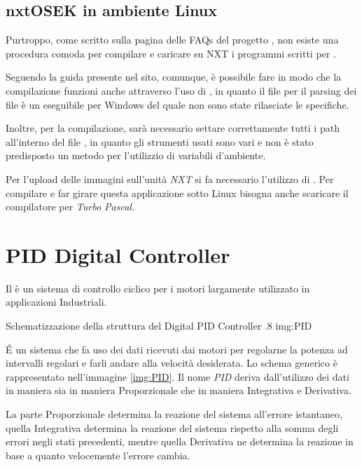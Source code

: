 \subsection{nxtOSEK in ambiente Linux} \label{sec:nxtoseklinux}
Purtroppo, come scritto sulla pagina delle FAQs del progetto
\nxtOSEK{}\cite{bib:nxtOSEKFAQs}, non esiste una procedura comoda per
compilare e caricare su NXT i programmi scritti per \nxtOSEK{}.

Seguendo la guida presente nel sito\cite{bib:linuxinst}, comunque, è
possibile fare in modo che la compilazione funzioni anche attraverso l'uso
di , in quanto il file per il parsing dei file
 è un eseguibile per Windows del quale non sono state
rilasciate le specifiche.

Inoltre, per la compilazione, sarà necessario settare correttamente tutti i
path all'interno del file , in quanto gli strumenti
usati sono vari e non è stato predisposto un metodo per l'utilizzio di
variabili d'ambiente.

Per l'upload delle immagini sull'unità \emph{NXT} si fa necessario
l'utilizzo di . Per compilare e far girare questa
applicazione sotto Linux bisogna anche scaricare il compilatore per
\emph{Turbo Pascal}.

\section{PID Digital Controller}\label{sec:PIDTheo}
Il \PID{} è un sistema di controllo ciclico per i motori largamente
utilizzato in applicazioni Industriali.

        {Schematizzazione della struttura del Digital PID Controller}
        {.8}
        {img:PID}

\'E un sistema che fa uso dei dati ricevuti dai motori per regolarne la
potenza ad intervalli regolari e farli andare alla velocità desiderata. Lo
schema generico è rappresentato nell'immagine \ref{img:PID}. Il nome
\emph{PID} deriva dall'utilizzo dei dati in maniera sia in maniera
Proporzionale che in maniera Integrativa e Derivativa.

La parte Proporzionale determina la reazione del sistema all'errore
istantaneo, quella Integrativa determina la reazione del sistema rispetto
alla somma degli errori negli stati precedenti, mentre quella Derivativa
ne determina la reazione in base a quanto velocemente l'errore cambia.


